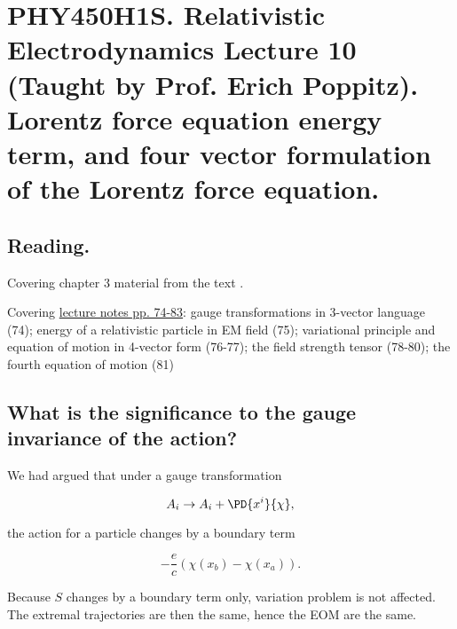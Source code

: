 
%

\chapter{PHY450H1S.  Relativistic Electrodynamics Lecture 10 (Taught by Prof. Erich Poppitz).  Lorentz force equation energy term, and four vector formulation of the Lorentz force equation.}
\label{chap:relativisticElectrodynamicsL10}
{}
\date{Feb 8, 2011}

\beginArtNoToc

\section{Reading.}

Covering chapter 3 material from the text \cite{landau1980classical}.

Covering \href{http://www.physics.utoronto.ca/~poppitz/e-poppitz/PHY450_files/RelEMpp74-83.pdf}{lecture notes pp. 74-83}: gauge transformations in 3-vector language (74); energy of a relativistic particle in EM field (75); variational principle and equation of motion in 4-vector form (76-77); the field strength tensor (78-80); the fourth equation of motion (81)

\section{What is the significance to the gauge invariance of the action?}

We had argued that under a gauge transformation

\begin{equation}\label{eqn:relativisticElectrodynamicsL10:10}
A_i \rightarrow A_i + \PD{x^i}{\chi},
\end{equation}

the action for a particle changes by a boundary term 

\begin{equation}\label{eqn:relativisticElectrodynamicsL10:30}
- \frac{e}{c} ( \chi(x_b) - \chi(x_a) ).
\end{equation}

Because $S$ changes by a boundary term only, variation problem is not affected.  The extremal trajectories are then the same, hence the EOM are the same.


